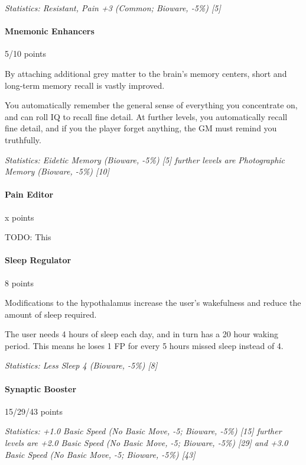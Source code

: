 \begin{multicols*}{3}
	\textit{\textcolor{OliveGreen}{Statistics: Resistant, Pain +3 (Common; Bioware, -5\%) [5] }}
	
	\paragraph{Mnemonic Enhancers}
	\begin{flushright}
		5/10 points
	\end{flushright}
	
	By attaching additional grey matter to the brain's memory centers, short and long-term memory recall is vastly improved. 
	
	You automatically remember the general sense of everything you concentrate on, and can roll IQ to recall fine detail. At further levels, you automatically recall fine detail, and if you the player forget anything, the GM must remind you truthfully. 
	
	\textit{\textcolor{OliveGreen}{Statistics: Eidetic Memory (Bioware, -5\%) [5] further levels are Photographic Memory (Bioware, -5\%) [10]}}
	
	\paragraph{Pain Editor}
	\begin{flushright}
		x points
	\end{flushright}

	TODO: This
	
	\paragraph{Sleep Regulator}
	\begin{flushright}
		8 points
	\end{flushright}
	
	Modifications to the hypothalamus increase the user's wakefulness and reduce the amount of sleep required. 
	
	The user needs 4 hours of sleep each day, and in turn has a 20 hour waking period. This means he loses 1 FP for every 5 hours missed sleep instead of 4.
	
	\textit{\textcolor{OliveGreen}{Statistics: Less Sleep 4 (Bioware, -5\%) [8]}}
	
	\paragraph{Synaptic Booster}
	\begin{flushright}
		15/29/43 points
	\end{flushright}
	
	\textit{\textcolor{OliveGreen}{Statistics: +1.0 Basic Speed (No Basic Move, -5; Bioware, -5\%) [15] further levels are +2.0 Basic Speed (No Basic Move, -5; Bioware, -5\%) [29] and +3.0 Basic Speed (No Basic Move, -5; Bioware, -5\%) [43]}}
	
\end{multicols*}